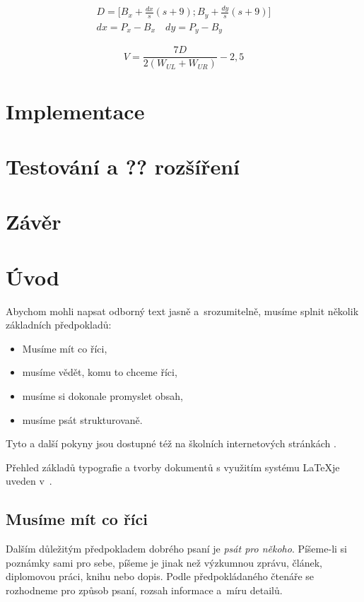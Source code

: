 \begin{eqnarray}
  D = \bigg[ B_{x} + \frac{dx}{s}(s + 9) ; B_{y} + \frac{dy}{s}(s + 9) \bigg] \\
  dx = P_{x} - B_{x} \quad dy = P_{y} - B_{y}
\end{eqnarray}

\begin{equation}
  V = \frac{7 D}{2 (W_{UL} + W_{UR})} - 2,5
\end{equation}
\chapter{Implementace}
\chapter{Testování a ?? rozšíření}
\chapter{Závěr}






\chapter{Úvod}
Abychom mohli napsat odborný text jasně a~srozumitelně, musíme splnit několik základních předpokladů:
\begin{itemize}
\item Musíme mít co říci,
\item musíme vědět, komu to chceme říci,
\item musíme si dokonale promyslet obsah,
\item musíme psát strukturovaně. 
\end{itemize}

Tyto a další pokyny jsou dostupné též na školních internetových stránkách \cite{fitWeb}.

Přehled základů typografie a tvorby dokumentů s využitím systému \LaTeX je 
uveden v~\cite{Rybicka}.

\section{Musíme mít co říci}
Dalším důležitým předpokladem dobrého psaní je {\it psát pro někoho}. Píšeme-li si poznámky sami pro sebe, píšeme je jinak než výzkumnou zprávu, článek, diplomovou práci, knihu nebo dopis. Podle předpokládaného čtenáře se rozhodneme pro způsob psaní, rozsah informace a~míru detailů.


